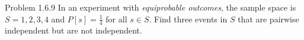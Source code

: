 \begin{problem}{Problem 1.6.9}
    In an experiment with \textit{equiprobable outcomes}, the sample space is \(S = {1,2,3,4}\) and \(P[s] = \frac{1}{4}\) for all \(s \in S\). Find three events in \(S\) that are pairwise independent but are not independent.
\end{problem}